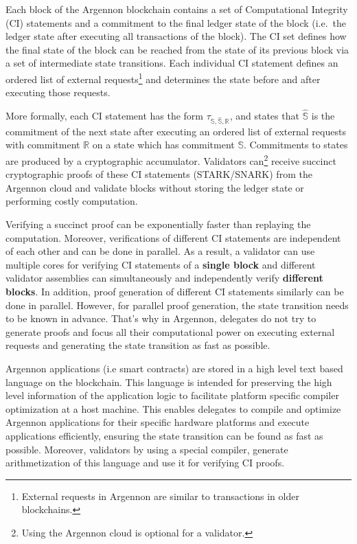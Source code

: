Each block of the Argennon blockchain contains a set of Computational Integrity (CI) statements and a commitment to
the final ledger state of the block (i.e.\ the ledger state after executing all transactions of the block). The CI
set defines how the final state of the block can be reached from
the state of its previous block via a set of intermediate state transitions. Each individual CI statement defines
an ordered list of external requests\footnote{External requests in Argennon are
similar to transactions in older blockchains.} and determines the state before and after executing those requests.

More formally, each CI statement has the form $\tau_{\mathbb{S}, \hat{\mathbb{S}}, \mathbb{R}}$, and states that
$\hat{\mathbb{S}}$ is the commitment of the next state after executing an ordered list of external requests with
commitment $\mathbb{R}$ on a state which has commitment $\mathbb{S}$.
Commitments to states are produced by a cryptographic accumulator.
Validators can\footnote{Using the Argennon cloud is optional for a validator.} receive succinct cryptographic proofs
of these CI statements (STARK/SNARK) from the Argennon cloud and validate blocks without storing the ledger state
or performing costly computation.

Verifying a succinct proof can be exponentially faster than replaying the computation. Moreover, verifications of
different CI statements are independent of each other and can be done in parallel. As a result, a validator can use
multiple cores for verifying CI statements of a \textbf{single block} and different validator assemblies can
simultaneously and
independently verify \textbf{different blocks}.
In addition, proof generation of different CI statements similarly can be done in parallel. However, for parallel
proof generation, the state transition needs to be known in advance. That's why in Argennon, delegates do not try
to generate proofs and focus all their computational power on executing external requests and
generating the state transition as fast as possible.

Argennon applications (i.e smart contracts) are stored in a high level text based language on the blockchain. This
language is intended for preserving the
high level information of the application logic to facilitate platform specific compiler optimization at a host
machine. This enables delegates to compile and optimize Argennon applications for their specific hardware platforms
and execute applications efficiently, ensuring the state transition can be found as fast as possible. Moreover,
validators by using a special compiler, generate arithmetization of this language and use it for verifying CI proofs.

